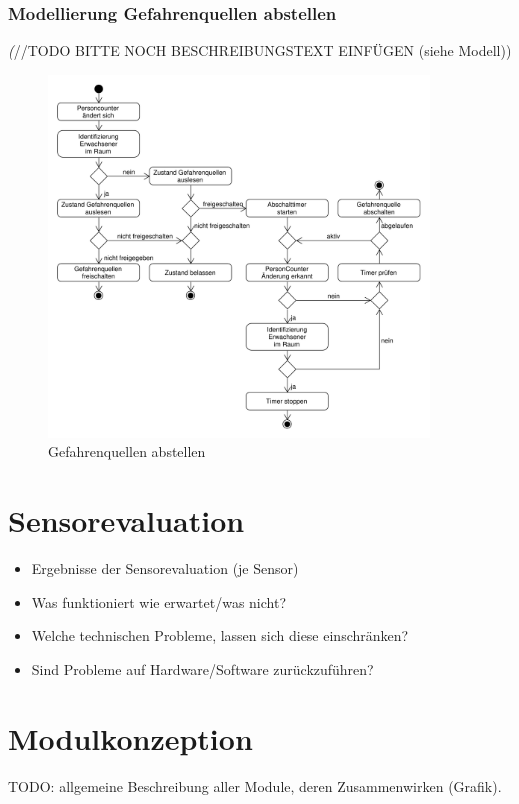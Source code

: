 \subsubsection{Modellierung Gefahrenquellen abstellen}
\emph(//TODO BITTE NOCH BESCHREIBUNGSTEXT EINFÜGEN (siehe Modell))
\begin{figure}[h!]
	\centering
	\includegraphics[width=0.9\textwidth]{img/Szenarien/GefahrenquellenAbstellen.pdf}
	\caption{Gefahrenquellen abstellen}
	\label{fig:szenarienGefahrenquellenAbstellen}
\end{figure}

\section{Sensorevaluation}
\begin{itemize}
	\item Ergebnisse der Sensorevaluation (je Sensor)
	\item Was funktioniert wie erwartet/was nicht?
	\item Welche technischen Probleme, lassen sich diese einschränken?
	\item Sind Probleme auf Hardware/Software zurückzuführen?
\end{itemize}


\section{Modulkonzeption}
TODO: allgemeine Beschreibung aller Module, deren Zusammenwirken (Grafik).

